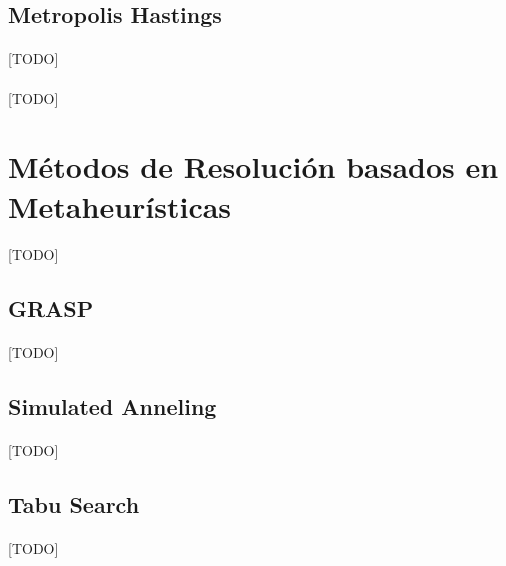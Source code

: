 \documentclass{subfiles}
\begin{document}
      \subsection{Metropolis Hastings}
      \label{sec:solving_metropolis}

        \paragraph{}
        [TODO]

      \paragraph{}
      [TODO]

    \section{Métodos de Resolución basados en Metaheurísticas}
    \label{sec:solving_metaheuristics}

      \paragraph{}
      [TODO]

      \subsection{GRASP}
      \label{sec:solving_grasp}

        \paragraph{}
        [TODO]

      \subsection{Simulated Anneling}
      \label{sec:solving_simulated_anneling}

        \paragraph{}
        [TODO]

      \subsection{Tabu Search}
      \label{sec:solving_tabu}

        \paragraph{}
        [TODO]
\end{document}
